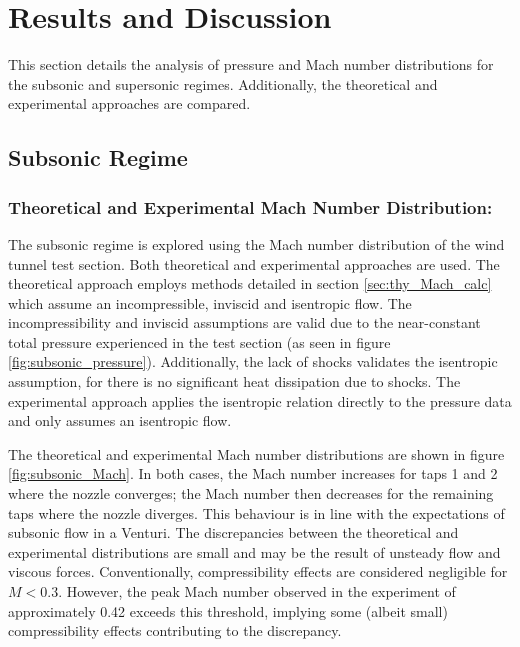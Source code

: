 \documentclass[runningheads]{llncs}
\begin{document}
\section{Results and Discussion}

This section details the analysis of pressure and Mach number distributions for the subsonic and supersonic regimes. Additionally, the theoretical and experimental approaches are compared.

\subsection{Subsonic Regime}

\subsubsection{Theoretical and Experimental Mach Number Distribution:}
\label{sec:sup_mach_comp}
The subsonic regime is explored using the Mach number distribution of the wind tunnel test section. Both theoretical and experimental approaches are used. The theoretical approach employs methods detailed in section \ref{sec:thy_Mach_calc} which assume an incompressible, inviscid and isentropic flow. The incompressibility and inviscid assumptions are valid due to the near-constant total pressure experienced in the test section (as seen in figure \ref{fig:subsonic_pressure}). Additionally, the lack of shocks validates the isentropic assumption, for there is no significant heat dissipation due to shocks. The experimental approach applies the isentropic relation directly to the pressure data and only assumes an isentropic flow.\newline

\noindent
The theoretical and experimental Mach number distributions are shown in figure \ref{fig:subsonic_Mach}. In both cases, the Mach number increases for taps 1 and 2 where the nozzle converges; the Mach number then decreases for the remaining taps where the nozzle diverges. This behaviour is in line with the expectations of subsonic flow in a Venturi. The discrepancies between the theoretical and experimental distributions are small and may be the result of unsteady flow and viscous forces. Conventionally, compressibility effects are considered negligible for $M < 0.3$. However, the peak Mach number observed in the experiment of approximately 0.42 exceeds this threshold, implying some (albeit small) compressibility effects contributing to the discrepancy.\newline
\end{document}
